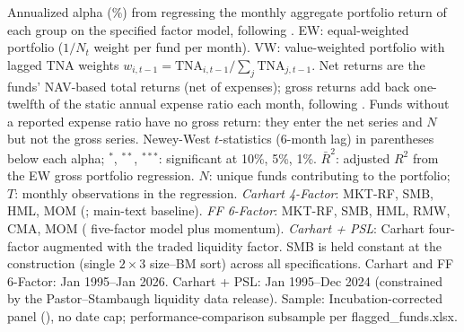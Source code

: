 \begin{table}[!htbp]
\begin{minipage}{\tabletempwidth}
\begin{singlespace}
Annualized alpha (\%) from regressing the monthly aggregate portfolio return of each group on the specified factor model, following \textcite{FamaFrench2010}. EW: equal-weighted portfolio ($1/N_t$ weight per fund per month). VW: value-weighted portfolio with lagged TNA weights $w_{i,t-1} = \text{TNA}_{i,t-1}/\sum_j \text{TNA}_{j,t-1}$. Net returns are the funds' NAV-based total returns (net of expenses); gross returns add back one-twelfth of the static annual expense ratio each month, following \textcite{FamaFrench2010}. Funds without a reported expense ratio have no gross return: they enter the net series and $N$ but not the gross series. Newey-West $t$-statistics (6-month lag) in parentheses below each alpha; $^{*}$, $^{**}$, $^{***}$: significant at 10\%, 5\%, 1\%. $\bar{R}^2$: adjusted $R^2$ from the EW gross portfolio regression. $N$: unique funds contributing to the portfolio; $T$: monthly observations in the regression. \textit{Carhart 4-Factor}: MKT-RF, SMB, HML, MOM (\citealt{Carhart1997}; main-text baseline). \textit{FF 6-Factor}: MKT-RF, SMB, HML, RMW, CMA, MOM (\citealt{FamaFrench2015} five-factor model plus momentum). \textit{Carhart + PSL}: Carhart four-factor augmented with the \textcite{PastorStambaugh2003} traded liquidity factor. SMB is held constant at the \textcite{FamaFrench1993} construction (single $2\times3$ size--BM sort) across all specifications. Carhart and FF 6-Factor: Jan 1995--Jan 2026. Carhart + PSL: Jan 1995--Dec 2024 (constrained by the Pastor--Stambaugh liquidity data release). Sample: Incubation-corrected panel (\citealt{Evans2010}), no date cap; performance-comparison subsample per flagged\_funds.xlsx.
\end{singlespace}
\end{minipage}
\end{table}
